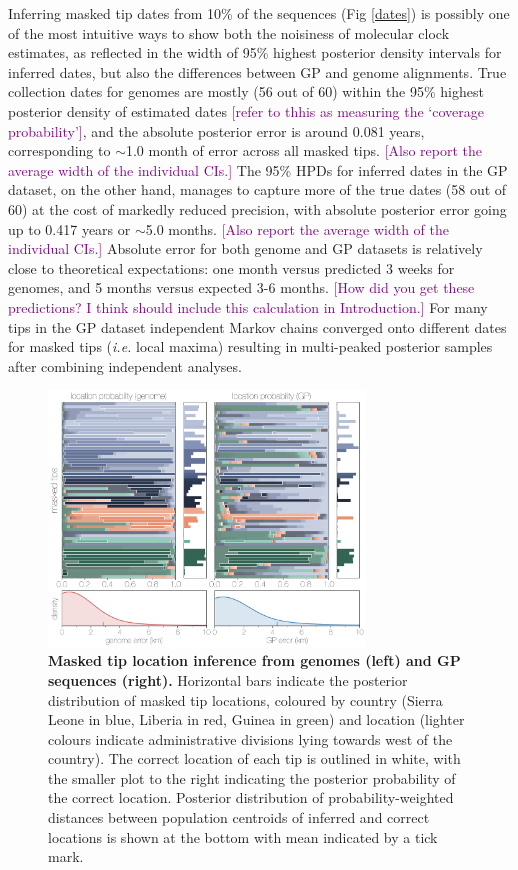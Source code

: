 \documentclass[11pt,oneside,letterpaper]{article}
\def\tbc#1{\textcolor{purple}{[#1]}}
\begin{document}
Inferring masked tip dates from 10\% of the sequences (Fig \ref{dates}) is possibly one of the most intuitive ways to show both the noisiness of molecular clock estimates, as reflected in the width of 95\% highest posterior density intervals for inferred dates, but also the differences between GP and genome alignments.
True collection dates for genomes are mostly (56 out of 60) within the 95\% highest posterior density of estimated dates \tbc{refer to thhis as measuring the `coverage probability'}, and the absolute posterior error is around 0.081 years, corresponding to $\sim$1.0 month of error across all masked tips.
\tbc{Also report the average width of the individual CIs.}
The 95\% HPDs for inferred dates in the GP dataset, on the other hand, manages to capture more of the true dates (58 out of 60) at the cost of markedly reduced precision, with absolute posterior error going up to 0.417 years or $\sim$5.0 months.
\tbc{Also report the average width of the individual CIs.}
Absolute error for both genome and GP datasets is relatively close to theoretical expectations: one month versus predicted 3 weeks for genomes, and 5 months versus expected 3-6 months.
\tbc{How did you get these predictions? I think should include this calculation in Introduction.}
For many tips in the GP dataset independent Markov chains converged onto different dates for masked tips (\textit{i.e.} local maxima) resulting in multi-peaked posterior samples after combining independent analyses.

\begin{figure}[h]
 \centering
	\includegraphics[width=0.75\textwidth]{figures/fig3_locations.png}
	\caption{\textbf{Masked tip location inference from genomes (left) and GP sequences (right).}
  Horizontal bars indicate the posterior distribution of masked tip locations, coloured by country (Sierra Leone in blue, Liberia in red, Guinea in green) and location (lighter colours indicate administrative divisions lying towards west of the country).
  The correct location of each tip is outlined in white, with the smaller plot to the right indicating the posterior probability of the correct location.
  Posterior distribution of probability-weighted distances between population centroids of inferred and correct locations is shown at the bottom with mean indicated by a tick mark.
	}
	\label{locations}
\end{figure}
\end{document}
